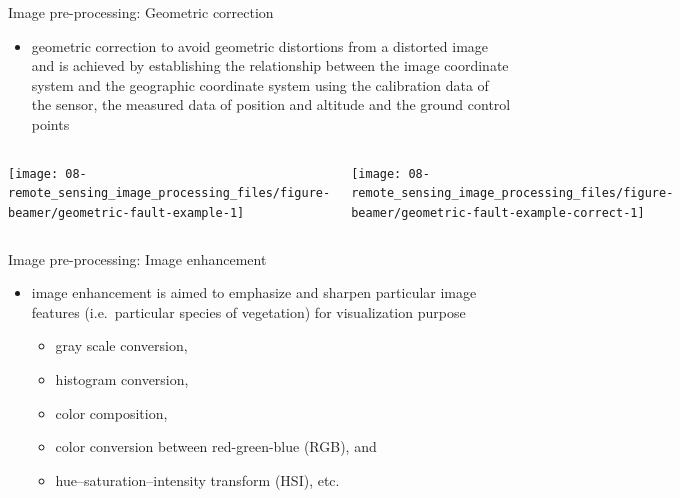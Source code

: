 \documentclass[10pt,dvipsnames,ignorenonframetext,aspectratio=169]{beamer}
\providecommand{\tightlist}{%
  \setlength{\itemsep}{0pt}\setlength{\parskip}{0pt}}
\begin{document}
\begin{frame}{Image pre-processing: Geometric correction}
\protect\hypertarget{image-pre-processing-geometric-correction}{}
\begin{itemize}
\tightlist
\item
  geometric correction to avoid geometric distortions from a distorted
  image and is achieved by establishing the relationship between the
  image coordinate system and the geographic coordinate system using the
  calibration data of the sensor, the measured data of position and
  altitude and the ground control points
\end{itemize}

\begin{columns}[T, onlytextwidth]


\begin{center}\texttt{[image: 08-remote\_sensing\_image\_processing\_files/figure-beamer/geometric-fault-example-1]} \end{center}



\begin{center}\texttt{[image: 08-remote\_sensing\_image\_processing\_files/figure-beamer/geometric-fault-example-correct-1]} \end{center}

\end{columns}
\end{frame}

\begin{frame}{Image pre-processing: Image enhancement}
\protect\hypertarget{image-pre-processing-image-enhancement}{}
\begin{itemize}
\tightlist
\item
  image enhancement is aimed to emphasize and sharpen particular image
  features (i.e.~particular species of vegetation) for visualization
  purpose

  \begin{itemize}
  \tightlist
  \item
    gray scale conversion,
  \item
    histogram conversion,
  \item
    color composition,
  \item
    color conversion between red-green-blue (RGB), and
  \item
    hue--saturation--intensity transform (HSI), etc.
  \end{itemize}
\end{itemize}
\end{frame}
\end{document}
